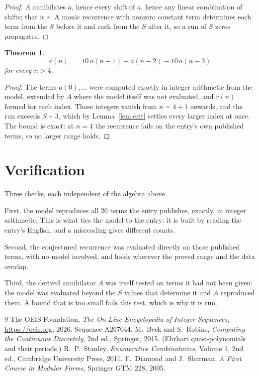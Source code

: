 \documentclass[11pt,a4paper]{article}
\theoremstyle{plain}
\newtheorem{theorem}{Theorem}
\theoremstyle{definition}
\begin{document}
\begin{proof}
$A$ annihilates $a$, hence every shift of $a$, hence any linear combination of shifts; that is
$r$. A monic recurrence with nonzero constant term determines each term from the $S$ before it
and each from the $S$ after it, so a run of $S$ zeros propagates.
\end{proof}

\begin{theorem}
\[
a(n)\;=\;10\,a(n-1) + a(n-2) - 10\,a(n-3)
\]
for every $n>4$.
\end{theorem}

\begin{proof}
The terms $a(0),\dots$ were computed exactly in integer arithmetic from the model, extended by
$A$ where the model itself was not evaluated, and $r(n)$ formed for each index. Those integers
vanish from $n=4+1$ onwards, and the run exceeds $S+3$, which by
Lemma~\ref{lem:crit} settles every larger index at once. The bound is exact: at $n=4$ the recurrence fails on the entry's own published terms, so no larger range holds.
\end{proof}

\section{Verification}

Three checks, each independent of the algebra above.

First, the model reproduces all $20$ terms the entry publishes, exactly, in integer
arithmetic. This is what ties the model to the entry: it is built by reading the entry's
English, and a misreading gives different counts.

Second, the conjectured recurrence was evaluated directly on those published terms, with no
model involved, and holds wherever the proved range and the data overlap.

Third, the derived annihilator $A$ was itself tested on terms it had not been given: the model
was evaluated beyond the $S$ values that determine it and $A$ reproduced them. A bound that is
too small fails this test, which is why it is run.

\begin{thebibliography}{9}
 The OEIS Foundation, \emph{The On-Line Encyclopedia of Integer
Sequences}, \url{https://oeis.org}, 2026. Sequence A267044.
 M.~Beck and S.~Robins, \emph{Computing the Continuous Discretely},
2nd ed., Springer, 2015. (Ehrhart quasi-polynomials and their periods.)
 R.~P.~Stanley, \emph{Enumerative Combinatorics}, Volume 1, 2nd ed.,
Cambridge University Press, 2011.
 F.~Diamond and J.~Shurman, \emph{A First Course in Modular Forms},
Springer GTM 228, 2005.
\end{thebibliography}
\end{document}
